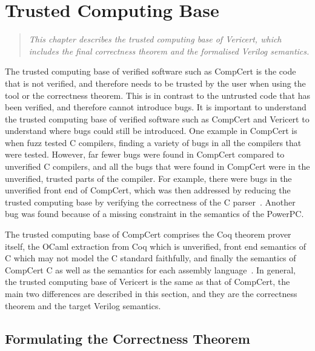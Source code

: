 \chapter{Trusted Computing Base}%
\label{sec:trusted-computing-base}

\begin{quote}\itshape
  This chapter describes the trusted computing base of Vericert, which includes
  the final correctness theorem and the formalised Verilog semantics.
\end{quote}

\noindent The trusted computing base of verified software such as CompCert is
the code that is not verified, and therefore needs to be trusted by the user
when using the tool or the correctness theorem.  This is in contrast to the
untrusted code that has been verified, and therefore cannot introduce bugs.  It
is important to understand the trusted computing base of verified software such
as CompCert and Vericert to understand where bugs could still be introduced.
One example in CompCert is when \textcite{yang11_findin_under_bugs_c_compil}
fuzz tested C compilers, finding a variety of bugs in all the compilers that
were tested.  However, far fewer bugs were found in CompCert compared to
unverified C compilers, and all the bugs that were found in CompCert were in the
unverified, trusted parts of the compiler.  For example, there were bugs in the
unverified front end of CompCert, which was then addressed by reducing the
trusted computing base by verifying the correctness of the C
parser~\cite{jourdan12_valid_lr_parser}.  Another bug was found because of a
missing constraint in the semantics of the PowerPC.

The trusted computing base of CompCert comprises the Coq theorem prover itself,
the OCaml extraction from Coq which is unverified, front end semantics of C
which may not model the C standard faithfully, and finally the semantics of
CompCert C as well as the semantics for each assembly
language~\cite{monniaux22_tcbcvc}.  In general, the trusted computing base of
Vericert is the same as that of CompCert, the main two differences are described
in this section, and they are the correctness theorem and the target Verilog
semantics.

\section{Formulating the Correctness Theorem}

